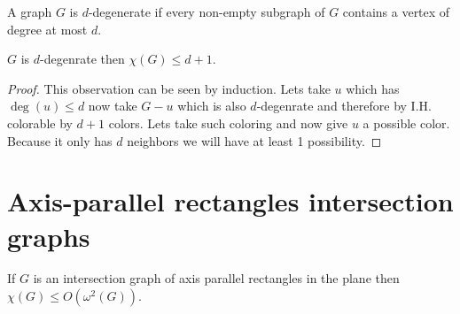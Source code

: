 \begin{defn}
	A graph $G$ is $d$-degenerate if every non-empty subgraph of $G$ contains a vertex of degree at most $d$.
\end{defn}

\begin{observ}
	$G$ is $d$-degenrate then $\chi(G) \leq d+1$.
\end{observ}

\begin{proof}
	This observation can be seen by induction. Lets take $u$ which has $\deg(u) \leq d$ now take $G - u$ which is also $d$-degenrate and therefore by I.H. colorable by $d+1$ colors. Lets take such coloring and now give $u$ a possible color. Because it only has $d$ neighbors we will have at least 1 possibility.
\end{proof}

\section{Axis-parallel rectangles intersection graphs}

\begin{thm}
	If $G$ is an intersection graph of axis parallel rectangles in the plane then $\chi(G) \leq O(\omega^2 (G))$.
\end{thm}

